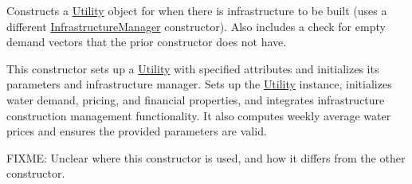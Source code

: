 Constructs a \mbox{\hyperlink{classUtility}{Utility}} object for when there is infrastructure to be built (uses a different \mbox{\hyperlink{classInfrastructureManager}{Infrastructure\+Manager}} constructor). Also includes a check for empty demand vectors that the prior constructor does not have. 

This constructor sets up a \mbox{\hyperlink{classUtility}{Utility}} with specified attributes and initializes its parameters and infrastructure manager. Sets up the \mbox{\hyperlink{classUtility}{Utility}} instance, initializes water demand, pricing, and financial properties, and integrates infrastructure construction management functionality. It also computes weekly average water prices and ensures the provided parameters are valid.

F\+I\+X\+ME\+: Unclear where this constructor is used, and how it differs from the other constructor.


